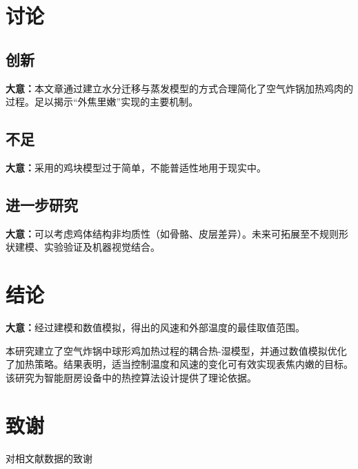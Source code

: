 \documentclass[12pt]{article}
\begin{document}
\section{讨论}

\subsection{创新}
\begin{summarybox}
	\textbf{大意：}本文章通过建立水分迁移与蒸发模型的方式合理简化了空气炸锅加热鸡肉的过程。足以揭示“外焦里嫩”实现的主要机制。
\end{summarybox}

\subsection{不足}
\begin{summarybox}
	\textbf{大意：}采用的鸡块模型过于简单，不能普适性地用于现实中。
\end{summarybox}

\subsection{进一步研究}
\begin{summarybox}
	\textbf{大意：}可以考虑鸡体结构非均质性（如骨骼、皮层差异）。未来可拓展至不规则形状建模、实验验证及机器视觉结合。
\end{summarybox}

\section{结论}
\begin{summarybox}
	\textbf{大意：}经过建模和数值模拟，得出的风速和外部温度的最佳取值范围。
\end{summarybox}
本研究建立了空气炸锅中球形鸡加热过程的耦合热-湿模型，并通过数值模拟优化了加热策略。结果表明，适当控制温度和风速的变化可有效实现表焦内嫩的目标。该研究为智能厨房设备中的热控算法设计提供了理论依据。

\section*{致谢}
\begin{summarybox}
	对相文献数据的致谢
\end{summarybox}



\end{document}
